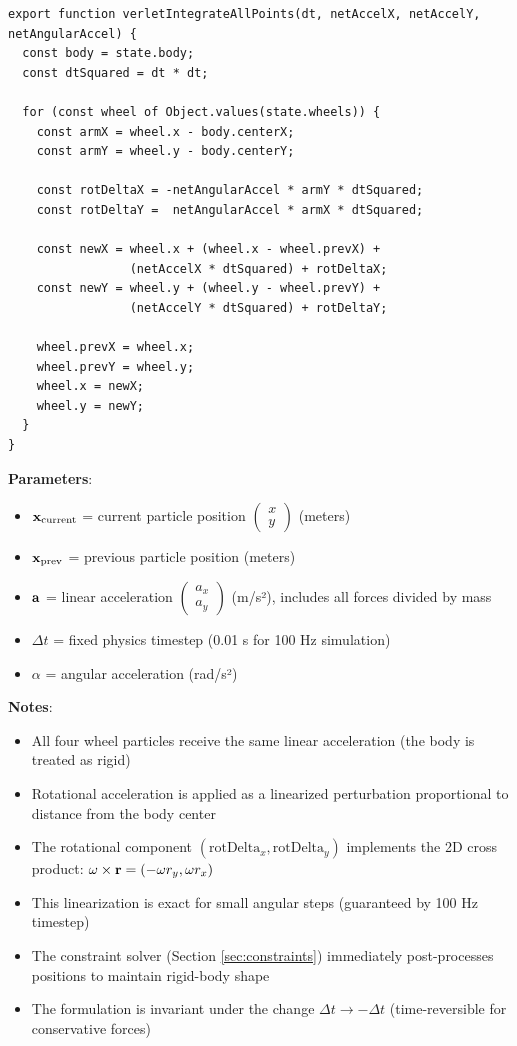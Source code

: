 \begin{lstlisting}[caption={Verlet integration for all four wheel particles}]
export function verletIntegrateAllPoints(dt, netAccelX, netAccelY, netAngularAccel) {
  const body = state.body;
  const dtSquared = dt * dt;

  for (const wheel of Object.values(state.wheels)) {
    const armX = wheel.x - body.centerX;
    const armY = wheel.y - body.centerY;

    const rotDeltaX = -netAngularAccel * armY * dtSquared;
    const rotDeltaY =  netAngularAccel * armX * dtSquared;

    const newX = wheel.x + (wheel.x - wheel.prevX) +
                 (netAccelX * dtSquared) + rotDeltaX;
    const newY = wheel.y + (wheel.y - wheel.prevY) +
                 (netAccelY * dtSquared) + rotDeltaY;

    wheel.prevX = wheel.x;
    wheel.prevY = wheel.y;
    wheel.x = newX;
    wheel.y = newY;
  }
}
\end{lstlisting}

\textbf{Parameters}:
\begin{itemize}
  \item $\mathbf{x}_{\text{current}}$ = current particle position $\begin{pmatrix} x \\ y \end{pmatrix}$ (meters)
  \item $\mathbf{x}_{\text{prev}}$ = previous particle position (meters)
  \item $\mathbf{a}$ = linear acceleration $\begin{pmatrix} a_x \\ a_y \end{pmatrix}$ (m/s²), includes all forces divided by mass
  \item $\Delta t$ = fixed physics timestep (0.01 s for 100 Hz simulation)
  \item $\alpha$ = angular acceleration (rad/s²)
\end{itemize}

\textbf{Notes}:
\begin{itemize}
  \item All four wheel particles receive the same linear acceleration (the body is treated as rigid)
  \item Rotational acceleration is applied as a linearized perturbation proportional to distance from the body center
  \item The rotational component $(\text{rotDelta}_x, \text{rotDelta}_y)$ implements the 2D cross product: $\omega \times \mathbf{r} = (-\omega r_y, \omega r_x)$
  \item This linearization is exact for small angular steps (guaranteed by 100 Hz timestep)
  \item The constraint solver (Section \ref{sec:constraints}) immediately post-processes positions to maintain rigid-body shape
  \item The formulation is invariant under the change $\Delta t \to -\Delta t$ (time-reversible for conservative forces)
\end{itemize}

